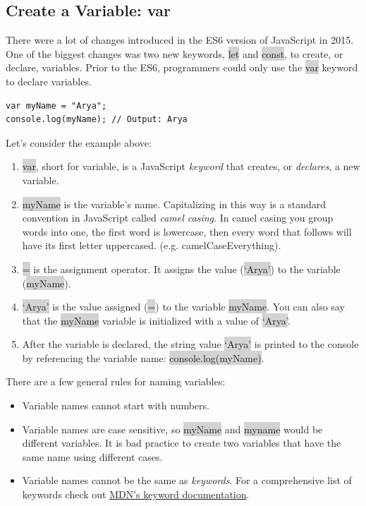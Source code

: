 \documentclass[11pt]{article}
\begin{document}
\subsection{Create a Variable: var} 
There were a lot of changes introduced in the ES6 version of JavaScript in 2015. One of the biggest changes was two new keywords, \colorbox{lightgray}{let} and \colorbox{lightgray}{const}, to create, or declare, variables. Prior to the ES6, programmers could only use the \colorbox{lightgray}{var} keyword to declare variables.
\begin{lstlisting}
var myName = "Arya";
console.log(myName); // Output: Arya
\end{lstlisting}
Let’s consider the example above:
\begin{enumerate}[leftmargin = *]
\item \colorbox{lightgray}{var}, short for variable, is a JavaScript \textit{keyword} that creates, or \textit{declares}, a new variable.
\item \colorbox{lightgray}{myName} is the variable’s name. Capitalizing in this way is a standard convention in JavaScript called \textit{camel casing}. In camel casing you group words into one, the first word is lowercase, then every word that follows will have its first letter uppercased. (e.g. camelCaseEverything).
\item \colorbox{lightgray}{=} is the assignment operator. It assigns the value (\colorbox{lightgray}{`Arya'}) to the variable (\colorbox{lightgray}{myName}).
\item \colorbox{lightgray}{`Arya'} is the value assigned (\colorbox{lightgray}{=}) to the variable \colorbox{lightgray}{myName}. You can also say that the \colorbox{lightgray}{myName} variable is initialized with a value of \colorbox{lightgray}{`Arya'}.
\item After the variable is declared, the string value \colorbox{lightgray}{`Arya'} is printed to the console by referencing the variable name: \colorbox{lightgray}{console.log(myName)}.
\end{enumerate}
There are a few general rules for naming variables:
\begin{itemize}[leftmargin = *]
\item Variable names cannot start with numbers.
\item Variable names are case sensitive, so \colorbox{lightgray}{myName} and \colorbox{lightgray}{myname} would be different variables. It is bad practice to create two variables that have the same name using different cases.
\item Variable names cannot be the same as \textit{keywords}. For a comprehensive list of keywords check out \href{https://developer.mozilla.org/en-US/docs/Web/JavaScript/Reference/Statements/var}{MDN’s keyword documentation}. 
\end{itemize}
\end{document}
